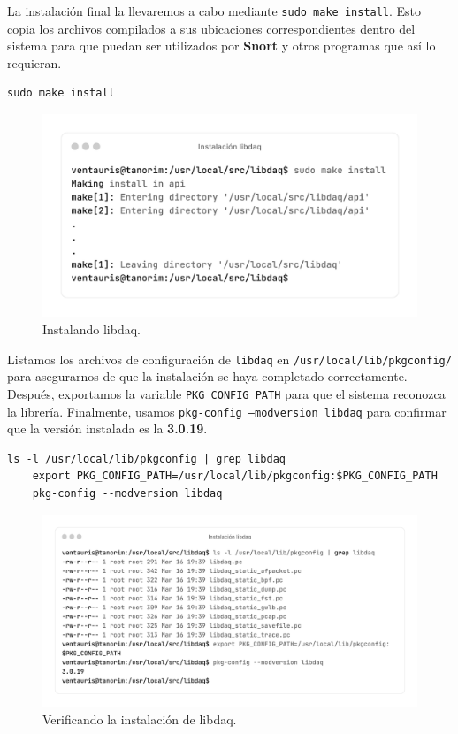 \documentclass[11pt,a4paper,twoside]{report}
\begin{document}
La instalación final la llevaremos a cabo mediante \texttt{sudo make install}. Esto copia los archivos compilados a sus ubicaciones correspondientes dentro del sistema para que puedan ser utilizados por \textbf{Snort} y otros programas que así lo requieran.

\begin{lstlisting}[style=commandstyle, caption={Instalando libdaq}]
	sudo make install
\end{lstlisting}

\begin{figure}[H]
	\centering
	\includegraphics[scale=0.12]{instalacion_snort/13-13.png}
	\caption{Instalando libdaq.}
\end{figure}

Listamos los archivos de configuración de \texttt{libdaq} en \texttt{/usr/local/lib/pkgconfig/} para asegurarnos de que la instalación se haya completado correctamente. Después, exportamos la variable \texttt{PKG\_CONFIG\_PATH} para que el sistema reconozca la librería. Finalmente, usamos \texttt{pkg-config --modversion libdaq} para confirmar que la versión instalada es la \textbf{3.0.19}.

\begin{lstlisting}[style=commandstyle, caption={Verificando instalación de libdaq}]
	ls -l /usr/local/lib/pkgconfig | grep libdaq
	export PKG_CONFIG_PATH=/usr/local/lib/pkgconfig:$PKG_CONFIG_PATH
	pkg-config --modversion libdaq
\end{lstlisting}

\begin{figure}[H]
	\centering
	\includegraphics[scale=0.]{instalacion_snort/14-14.png}
	\caption{Verificando la instalación de libdaq.}
\end{figure}
\end{document}
